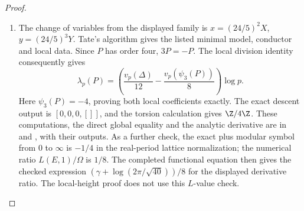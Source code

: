 \begin{proof}
\begin{enumerate}[label=\arabic*.,leftmargin=*]
\item The change of variables from the displayed family is
$x=(24/5)^2X$, $y=(24/5)^3Y$. Tate's algorithm gives the
listed minimal model, conductor and local data. Since $P$ has
order four, $3P=-P$. The local division identity consequently
gives
\[
 \lambda_p(P)=\left(\frac{v_p(\Delta)}{12}
                         -\frac{v_p(\psi_3(P))}{8}\right)\log p.
\]
Here $\psi_3(P)=-4$, proving both local coefficients exactly.
The exact descent output is $[0,0,0,[]]$, and the torsion
calculation gives $\Z/4\Z$. These computations, the direct
global equality and the analytic derivative are in
 and
, with their outputs.
As a further check, the exact plus modular symbol from $0$ to
$\infty$ is $-1/4$ in the real-period lattice normalization;
the numerical ratio $L(E,1)/\Omega$ is $1/8$. The completed
functional equation then gives the checked expression
$(\gamma+\log(2\pi/\sqrt{40}))/8$ for the displayed derivative
ratio. The local-height proof does not use this $L$-value check.
\end{enumerate}
\end{proof}

